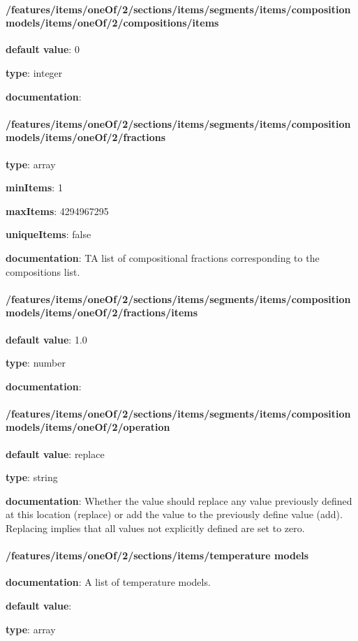 \begin{itemized}
\paragraph{/features/items/oneOf/2/sections/items/segments/items/composition models/items/oneOf/2/compositions/items} \begin{itemized}
\item {\bf default value}: 0
\item {\bf type}: integer
\item {\bf documentation}: 
\end{itemized}\end{itemized}\paragraph{/features/items/oneOf/2/sections/items/segments/items/composition models/items/oneOf/2/fractions} \begin{itemized}
\item {\bf type}: array
\item {\bf minItems}: 1
\item {\bf maxItems}: 4294967295
\item {\bf uniqueItems}: false
\item {\bf documentation}: TA list of compositional fractions corresponding to the compositions list.
\paragraph{/features/items/oneOf/2/sections/items/segments/items/composition models/items/oneOf/2/fractions/items} \begin{itemized}
\item {\bf default value}: 1.0
\item {\bf type}: number
\item {\bf documentation}: 
\end{itemized}\end{itemized}\paragraph{/features/items/oneOf/2/sections/items/segments/items/composition models/items/oneOf/2/operation} \begin{itemized}
\item {\bf default value}: replace
\item {\bf type}: string
\item {\bf documentation}: Whether the value should replace any value previously defined at this location (replace) or add the value to the previously define value (add). Replacing implies that all values not explicitly defined are set to zero.
\end{itemized}\paragraph{/features/items/oneOf/2/sections/items/temperature models} \begin{itemized}
\item {\bf documentation}: A list of temperature models.
\item {\bf default value}: 
\item {\bf type}: array

\end{itemized}
